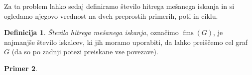 \documentclass[12pt,a4paper,twoside]{article}
\theoremstyle{definition} %
\newtheorem{definicija}{Definicija}[section]
\newtheorem{primer}[definicija]{Primer}
\theoremstyle{plain} %
\numberwithin{equation}{section}  %
\DeclareMathOperator{\fms}{fms}
\begin{document}
Za ta problem lahko sedaj definiramo število hitrega mešanega iskanja in si ogledamo njegovo vrednost na dveh preprostih primerih, poti in ciklu.
\begin{definicija}
    \emph{Število hitrega mešanega iskanja}, označimo $\fms{(G)}$, je najmanjše število iskalcev, ki jih moramo uporabiti, da lahko preiščemo cel graf $G$ (da so po zadnji potezi preiskane vse povezave).
\end{definicija}
\begin{primer}
    \label{prim:fms}
    \begin{figure}[h]
        \begin{subfigure}{0.5\textwidth}
            \centering
        \end{subfigure}
        \begin{subfigure}{0.49\textwidth}
            \centering
\end{subfigure}
\end{figure}
\end{primer}
\end{document}
